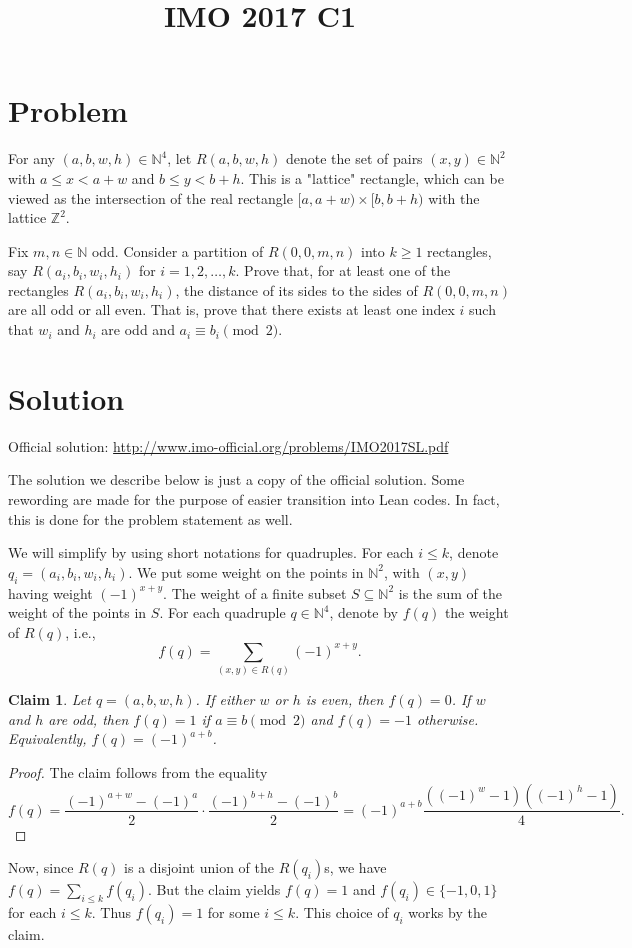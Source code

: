 \documentclass{article}
\title{IMO 2017 C1}
\author{}
\date{}
\newcommand{\N}{\mathbb{N}}
\newcommand{\Z}{\mathbb{Z}}
\newtheorem*{claim}{Claim}
\begin{document}
\maketitle



\section*{Problem}

For any $(a, b, w, h) \in \N^4$, let $R(a, b, w, h)$ denote the set of pairs $(x, y) \in \N^2$ with $a \leq x < a + w$ and $b \leq y < b + h$.
This is a "lattice" rectangle, which can be viewed as the intersection of the real rectangle $[a, a + w) \times [b, b + h)$ with the lattice $\Z^2$.

Fix $m, n \in \N$ odd.
Consider a partition of $R(0, 0, m, n)$ into $k \geq 1$ rectangles, say $R(a_i, b_i, w_i, h_i)$ for $i = 1, 2, \ldots, k$.
Prove that, for at least one of the rectangles $R(a_i, b_i, w_i, h_i)$, the distance of its sides to the sides of $R(0, 0, m, n)$ are all odd or all even.
That is, prove that there exists at least one index $i$ such that $w_i$ and $h_i$ are odd and $a_i \equiv b_i \pmod{2}$.



\section*{Solution}

Official solution: \url{http://www.imo-official.org/problems/IMO2017SL.pdf}

The solution we describe below is just a copy of the official solution.
Some rewording are made for the purpose of easier transition into Lean codes.
In fact, this is done for the problem statement as well.

We will simplify by using short notations for quadruples.
For each $i \leq k$, denote $q_i = (a_i, b_i, w_i, h_i)$.
We put some weight on the points in $\N^2$, with $(x, y)$ having weight $(-1)^{x + y}$.
The weight of a finite subset $S \subseteq \N^2$ is the sum of the weight of the points in $S$.
For each quadruple $q \in \N^4$, denote by $f(q)$ the weight of $R(q)$, i.e.,
\[ f(q) = \sum_{(x, y) \in R(q)} (-1)^{x + y}. \]

\begin{claim}
Let $q = (a, b, w, h)$.
If either $w$ or $h$ is even, then $f(q) = 0$.
If $w$ and $h$ are odd, then $f(q) = 1$ if $a \equiv b \pmod{2}$ and $f(q) = -1$ otherwise.
Equivalently, $f(q) = (-1)^{a + b}$.
\end{claim}
\begin{proof}
The claim follows from the equality
\[ f(q) = \frac{(-1)^{a + w} - (-1)^a}{2} \cdot \frac{(-1)^{b + h} - (-1)^b}{2} = (-1)^{a + b}\frac{((-1)^w - 1)((-1)^h - 1)}{4}. \]
\end{proof}

Now, since $R(q)$ is a disjoint union of the $R(q_i)$s, we have $f(q) = \sum_{i \leq k} f(q_i)$.
But the claim yields $f(q) = 1$ and $f(q_i) \in \{-1, 0, 1\}$ for each $i \leq k$.
Thus $f(q_i) = 1$ for some $i \leq k$.
This choice of $q_i$ works by the claim.
\end{document}

